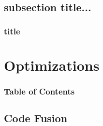 \documentclass[xcolor=dvipsnames]{beamer}
\begin{document}
	
	\subsection{subsection title...}
	
		\begin{frame} \frametitle{title}
	
		\end{frame}

\section{Optimizations} 

	\begin{frame} \frametitle{Table of Contents}
		\tableofcontents[currentsection]
	\end{frame} 
	
	
	\subsection{Code Fusion}
	
\end{document}
